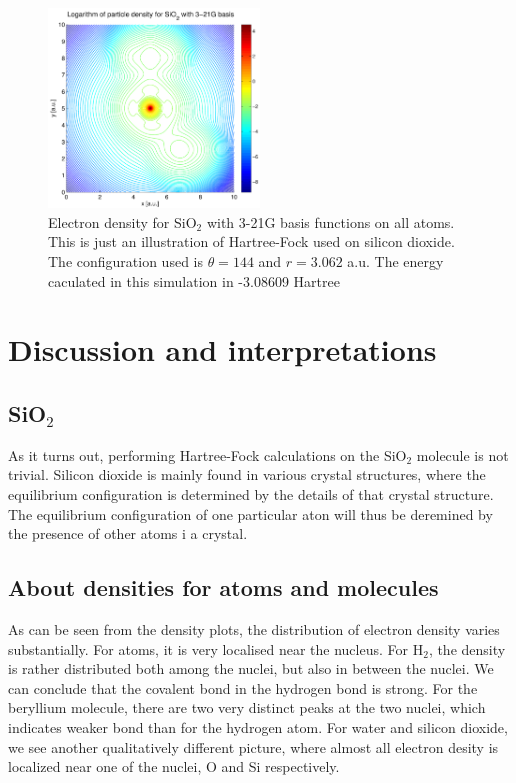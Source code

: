 \documentclass[a4paper,10pt, twocolumn, pre]{revtex4}
\begin{document}
\begin{figure}[h!tb]
\includegraphics[width=0.5\textwidth]{./figures/SiO2density_321g.pdf}
\caption{Electron density for SiO$_2$ with 3-21G basis functions on all atoms. This is just an illustration of Hartree-Fock used on silicon dioxide. The configuration used is $\theta=144$ and $r = 3.062$ a.u. The energy caculated in this simulation in -3.08609 Hartree}
\end{figure}

\section{Discussion and interpretations}

\subsection{SiO$_2$}
As it turns out, performing Hartree-Fock calculations on the SiO$_2$ molecule is not trivial. Silicon dioxide is mainly found in various crystal structures, where the equilibrium configuration is determined by the details of that crystal structure. The equilibrium configuration of one particular aton will thus be deremined by the presence of other atoms i a crystal. 

\subsection{About densities for atoms and molecules}
As can be seen from the density plots, the distribution of electron density varies substantially. For atoms, it is very localised near the nucleus. For H$_2$, the density is rather distributed both among the nuclei, but also in between the nuclei. We can conclude that the covalent bond in the hydrogen bond is strong. For the beryllium molecule, there are two very distinct peaks at the two nuclei, which indicates weaker bond than for the hydrogen atom. For water and silicon dioxide, we see another qualitatively different picture, where almost all electron desity is localized near one of the nuclei, O and Si respectively. 
\end{document}
